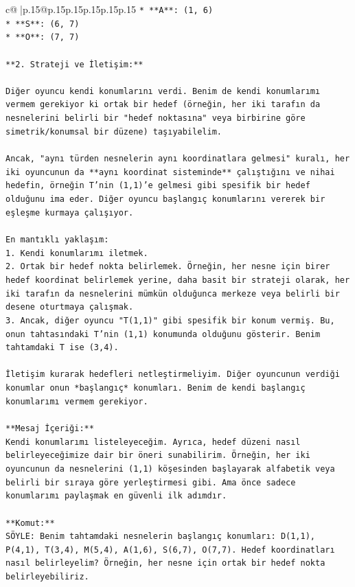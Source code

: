 \documentclass{article}
\begin{document}
{\begin{supertabular}{c@{$\;$}|p{.15\linewidth}@{}p{.15\linewidth}p{.15\linewidth}p{.15\linewidth}p{.15\linewidth}p{.15\linewidth}}
{{{\texttt{*   **A**: (1, 6)} \\
\texttt{*   **S**: (6, 7)} \\
\texttt{*   **O**: (7, 7)} \\
\\ 
\texttt{**2. Strateji ve İletişim:**} \\
\\ 
\texttt{Diğer oyuncu kendi konumlarını verdi. Benim de kendi konumlarımı vermem gerekiyor ki ortak bir hedef (örneğin, her iki tarafın da nesnelerini belirli bir "hedef noktasına" veya birbirine göre simetrik/konumsal bir düzene) taşıyabilelim.} \\
\\ 
\texttt{Ancak, "aynı türden nesnelerin aynı koordinatlara gelmesi" kuralı, her iki oyuncunun da **aynı koordinat sisteminde** çalıştığını ve nihai hedefin, örneğin T'nin (1,1)'e gelmesi gibi spesifik bir hedef olduğunu ima eder. Diğer oyuncu başlangıç konumlarını vererek bir eşleşme kurmaya çalışıyor.} \\
\\ 
\texttt{En mantıklı yaklaşım:} \\
\texttt{1.  Kendi konumlarımı iletmek.} \\
\texttt{2.  Ortak bir hedef nokta belirlemek. Örneğin, her nesne için birer hedef koordinat belirlemek yerine, daha basit bir strateji olarak, her iki tarafın da nesnelerini mümkün olduğunca merkeze veya belirli bir desene oturtmaya çalışmak.} \\
\texttt{3.  Ancak, diğer oyuncu "T(1,1)" gibi spesifik bir konum vermiş. Bu, onun tahtasındaki T'nin (1,1) konumunda olduğunu gösterir. Benim tahtamdaki T ise (3,4).} \\
\\ 
\texttt{İletişim kurarak hedefleri netleştirmeliyim. Diğer oyuncunun verdiği konumlar onun *başlangıç* konumları. Benim de kendi başlangıç konumlarımı vermem gerekiyor.} \\
\\ 
\texttt{**Mesaj İçeriği:**} \\
\texttt{Kendi konumlarımı listeleyeceğim. Ayrıca, hedef düzeni nasıl belirleyeceğimize dair bir öneri sunabilirim. Örneğin, her iki oyuncunun da nesnelerini (1,1) köşesinden başlayarak alfabetik veya belirli bir sıraya göre yerleştirmesi gibi. Ama önce sadece konumlarımı paylaşmak en güvenli ilk adımdır.} \\
\\ 
\texttt{**Komut:**} \\
\texttt{SÖYLE: Benim tahtamdaki nesnelerin başlangıç konumları: D(1,1), P(4,1), T(3,4), M(5,4), A(1,6), S(6,7), O(7,7). Hedef koordinatları nasıl belirleyelim? Örneğin, her nesne için ortak bir hedef nokta belirleyebiliriz.} \\
            }
        }
    }
     \\ \\


\end{supertabular}}
\end{document}

